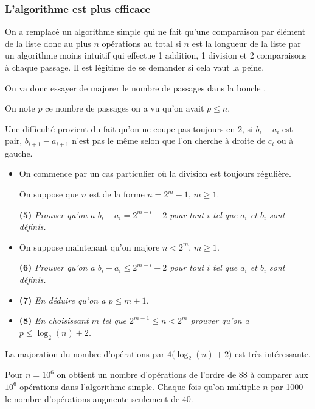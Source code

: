 \subsubsection{L'algorithme est plus efficace}

On a remplacé un algorithme simple qui ne fait qu'une comparaison par élément de la liste donc au plus $n$ opérations au total si $n$ est la longueur de la liste par un algorithme moins intuitif qui effectue 1 addition, 1 division et 2 comparaisons à chaque passage. Il est légitime de se demander si cela vaut la peine.

On va donc essayer de majorer le nombre de passages dans la boucle . 

On note $p$ ce nombre de passages on a vu qu'on avait $p\le n$.

Une difficulté provient du fait qu'on ne coupe pas toujours en 2, si $b_i-a_i$ est pair, $b_{i+1} - a_{i+1}$ n'est pas le même selon que l'on cherche à droite de $c_i$ ou à gauche.

\begin{itemize}
    \item On commence par un cas particulier où la division est toujours régulière.
    
    On suppose que $n$ est de la forme $n = 2^m-1$,  $m\ge 1$.

{\bf (5)} {\it Prouver qu'on a  $b_i - a_i = 2^{m-i} -2$ pour tout $i$ tel que $a_i$ et $b_i$ sont définis.}

    \item On  suppose maintenant qu'on majore  $n< 2^m$,  $m\ge 1$.

{\bf (6)} {\it Prouver qu'on a  $b_i - a_i \le  2^{m-i} -2$ pour tout $i$ tel que $a_i$ et $b_i$ sont définis.}

    \item {\bf (7)} {\it En déduire qu'on a $p \le m+1$.}

    \item {\bf (8)} {\it En choisissant $m$ tel que $2^{m-1} \le n < 2^{m}$ prouver qu'on a $p \le \log_2(n) + 2$.}
\end{itemize}

La majoration du nombre d'opérations par $4\bigl(\log_2(n) + 2)$ est très intéressante. 

Pour $n = 10^6$ on obtient un nombre d'opérations de l'ordre de $88$ à comparer aux $10^6$ opérations dans l'algorithme simple. Chaque fois qu'on multiplie $n$ par 1000 le nombre d'opérations augmente seulement de 40.

